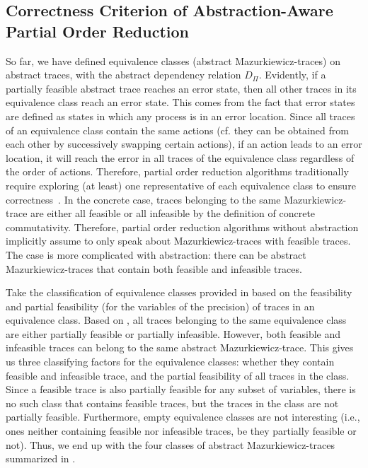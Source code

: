 \documentclass[numbook]{svjour3}
\begin{document}
\subsection{Correctness Criterion of Abstraction-Aware Partial Order Reduction}
\label{sec:aapor-high-level}

So far, we have defined equivalence classes (abstract Mazurkiewicz-traces) on abstract traces, with the abstract dependency relation $D_\Pi$. Evidently, if a partially feasible abstract trace reaches an error state, then all other traces in its equivalence class reach an error state. This comes from the fact that error states are defined as states in which any process is in an error location. Since all traces of an equivalence class contain the same actions (cf. they can be obtained from each other by successively swapping certain actions), if an action leads to an error location, it will reach the error in all traces of the equivalence class regardless of the order of actions. Therefore, partial order reduction algorithms traditionally require exploring (at least) one representative of each equivalence class to ensure correctness~\cite{source_persistent,godefroid-thesis}. In the concrete case, traces belonging to the same Mazurkiewicz-trace are either all feasible or all infeasible by the definition of concrete commutativity. Therefore, partial order reduction algorithms without abstraction implicitly assume to only speak about Mazurkiewicz-traces with feasible traces. The case is more complicated with abstraction: there can be abstract Mazurkiewicz-traces that contain both feasible and infeasible traces.

Take the classification of equivalence classes provided in  based on the feasibility and partial feasibility (for the variables of the precision) of traces in an equivalence class. Based on , all traces belonging to the same equivalence class are either partially feasible or partially infeasible. However, both feasible and infeasible traces can belong to the same abstract Mazurkiewicz-trace. This gives us three classifying factors for the equivalence classes: whether they contain feasible and infeasible trace, and the partial feasibility of all traces in the class. Since a feasible trace is also partially feasible for any subset of variables, there is no such class that contains feasible traces, but the traces in the class are not partially feasible. Furthermore, empty equivalence classes are not interesting (i.e., ones neither containing feasible nor infeasible traces, be they partially feasible or not). Thus, we end up with the four classes of abstract Mazurkiewicz-traces summarized in .
\end{document}
